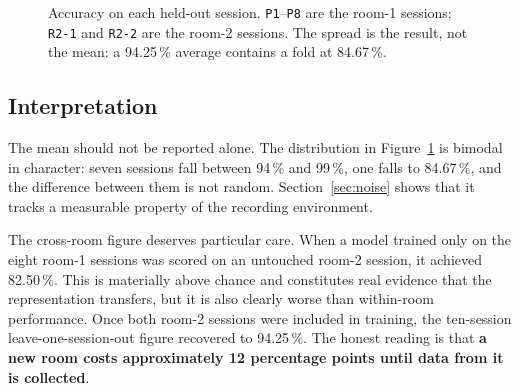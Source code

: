 \documentclass[11pt,a4paper]{article}
\newcommand{\code}[1]{\texttt{\small #1}}
\begin{document}
\begin{figure}[H]
\centering
{}
\caption{Accuracy on each held-out session. \code{P1}--\code{P8} are the room-1
sessions; \code{R2-1} and \code{R2-2} are the room-2 sessions. The spread is the
result, not the mean: a 94.25\,\% average contains a fold at 84.67\,\%.}
\label{fig:folds}
\end{figure}

\subsection{Interpretation}

The mean should not be reported alone. The distribution in
Figure~\ref{fig:folds} is bimodal in character: seven sessions fall between
94\,\% and 99\,\%, one falls to 84.67\,\%, and the difference between them is
not random. Section~\ref{sec:noise} shows that it tracks a measurable property
of the recording environment.

The cross-room figure deserves particular care. When a model trained only on
the eight room-1 sessions was scored on an untouched room-2 session, it
achieved 82.50\,\%. This is materially above chance and constitutes real
evidence that the representation transfers, but it is also clearly worse than
within-room performance. Once both room-2 sessions were included in training,
the ten-session leave-one-session-out figure recovered to 94.25\,\%. The honest
reading is that \textbf{a new room costs approximately 12 percentage points
until data from it is collected}.
\end{document}
